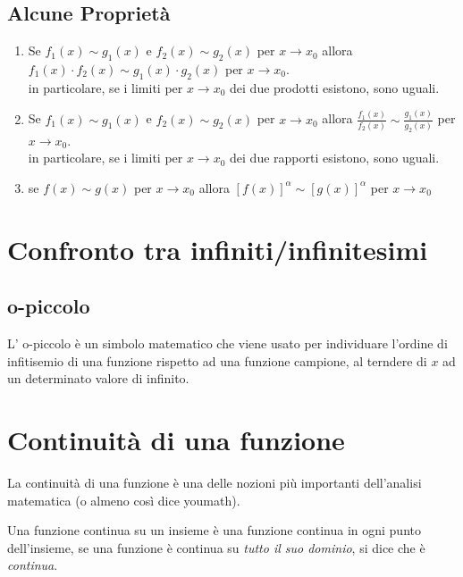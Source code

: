 \documentclass[12pt, a4paper, openany]{book}
\begin{document}
	\subsection*{Alcune Proprietà}
	\begin{enumerate}
		\item Se $f_1(x) \sim g_1(x)$ e $f_2(x) \sim g_2(x)$ per $x \to x_0$ allora $f_1(x) \cdot f_2(x) \sim g_1(x) \cdot g_2(x)$ per $x \to x_0$.
		      \\in particolare, se i limiti per $x \to x_0$ dei due prodotti esistono, sono uguali.
		\item Se $f_1(x) \sim g_1(x)$ e $f_2(x) \sim g_2(x)$ per $x \to x_0$ allora $\frac{f_1(x)}{f_2(x)} \sim \frac{g_1(x)}{g_2(x)}$ per $x \to x_0$.
		      \\in particolare, se i limiti per $x \to x_0$ dei due rapporti esistono, sono uguali.
		\item se $f(x) \sim g(x)$ per $x \to x_0$ allora $[f(x)]^\alpha \sim [g(x)]^\alpha$ per $x \to x_0$
	\end{enumerate}
	\section{Confronto tra infiniti/infinitesimi}
	\subsection*{o-piccolo}
	L' o-piccolo è un simbolo matematico che viene usato per individuare l'ordine di infitisemio di una funzione rispetto ad una funzione campione,
	al terndere di $x$ ad un determinato valore di infinito.


	\section{Continuità di una funzione}
	La continuità di una funzione è una delle nozioni più importanti dell'analisi matematica (o almeno così dice youmath).

	Una funzione continua su un insieme è una funzione continua in ogni punto dell'insieme, se una funzione è continua su \emph{tutto il suo dominio}, si dice che è \emph{continua}.
\end{document}
